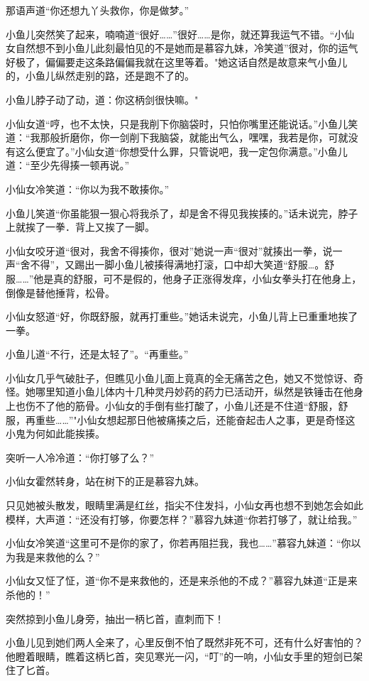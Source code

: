 \documentclass[12pt,oneside]{book}
\begin{document}
那语声道``你还想九丫头救你，你是做梦。''

小鱼儿突然笑了起来，喃喃道``很好\ldots\ldots{}''很好\ldots\ldots 是你，就还算我运气不错。``小仙女自然想不到小鱼儿此刻最怕见的不是她而是慕容九妹，冷笑道''很对，你的运气好极了，偏偏要走这条路偏偏我就在这里等着。"她这话自然是故意来气小鱼儿的，小鱼儿纵然走别的路，还是跑不了的。

小鱼儿脖子动了动，道：你这柄剑很快嘛。"

小仙女道``哼，也不太快，只是我削下你脑袋时，只怕你嘴里还能说话。''小鱼儿笑道：``我那般折磨你，你一剑削下我脑袋，就能出气么，嘿嘿，我若是你，可就没有这么便宜了。''小仙女道``你想受什么罪，只管说吧，我一定包你满意。''小鱼儿道：``至少先得揍一顿再说。''

小仙女冷笑道：``你以为我不敢揍你。''

小鱼儿笑道``你虽能狠一狠心将我杀了，却是舍不得见我挨揍的。''话未说完，脖子上就挨了一拳．背上又挨了一脚。

小仙女咬牙道``很对，我舍不得揍你，很对''她说一声``很对''就揍出一拳，说一声``舍不得''，又踢出一脚小鱼儿被揍得满地打滚，口中却大笑道``舒服\ldots。舒服\ldots\ldots{}''他是真的舒服，可不是假的，他身子正涨得发痒，小仙女拳头打在他身上，倒像是替他捶背，松骨。

小仙女怒道``好，你既舒服，就再打重些。''她话未说完，小鱼儿背上已重重地挨了一拳。

小鱼儿道``不行，还是太轻了''。``再重些。''

小仙女几乎气破肚子，但瞧见小鱼儿面上竟真的全无痛苦之色，她又不觉惊讶、奇怪。她哪里知道小鱼儿体内十几种灵丹妙药的药力已活动开，纵然是铁锤击在他身上也伤不了他的筋骨。小仙女的手倒有些打酸了，小鱼儿还是不住道``舒服，舒服，再重些\ldots\ldots{}''"小仙女想起那日他被痛揍之后，还能奋起击人之事，更是奇怪这小鬼为何如此能挨揍。

突听一人冷冷道：``你打够了么？''

小仙女霍然转身，站在树下的正是慕容九妹。

只见她被头散发，眼睛里满是红丝，指尖不住发抖，小仙女再也想不到她怎会如此模样，大声道：``还没有打够，你要怎样？''慕容九妹道``你若打够了，就让给我。''

小仙女冷笑道``这里可不是你的家了，你若再阻拦我，我也\ldots\ldots{}''慕容九妹道：``你以为我是来救他的么？''

小仙女又怔了怔，道``你不是来救他的，还是来杀他的不成？''慕容九妹道``正是来杀他的！''

突然掠到小鱼儿身旁，抽出一柄匕首，直刺而下！

小鱼儿见到她们两人全来了，心里反倒不怕了既然非死不可，还有什么好害怕的？他瞪着眼睛，瞧着这柄匕首，突见寒光一闪，``叮''的一响，小仙女手里的短剑已架住了匕首。
\end{document}
